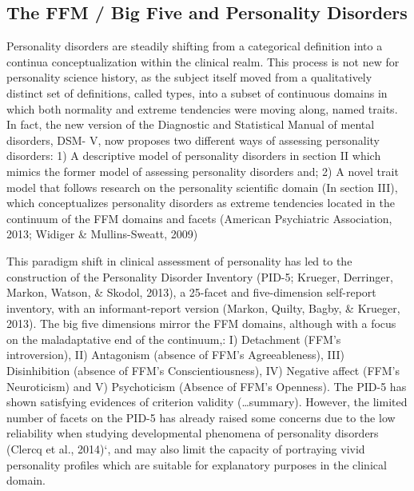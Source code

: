 \documentclass[man]{apa6}
\theoremstyle{definition}
\theoremstyle{definition}
\theoremstyle{definition}
\theoremstyle{remark}
\begin{document}
\hypertarget{the-ffm-big-five-and-personality-disorders}{%
\subsection{The FFM / Big Five and Personality
Disorders}\label{the-ffm-big-five-and-personality-disorders}}

Personality disorders are steadily shifting from a categorical
definition into a continua conceptualization within the clinical realm.
This process is not new for personality science history, as the subject
itself moved from a qualitatively distinct set of definitions, called
types, into a subset of continuous domains in which both normality and
extreme tendencies were moving along, named traits. In fact, the new
version of the Diagnostic and Statistical Manual of mental disorders,
DSM- V, now proposes two different ways of assessing personality
disorders: 1) A descriptive model of personality disorders in section II
which mimics the former model of assessing personality disorders and; 2)
A novel trait model that follows research on the personality scientific
domain (In section III), which conceptualizes personality disorders as
extreme tendencies located in the continuum of the FFM domains and
facets (American Psychiatric Association, 2013; Widiger \&
Mullins-Sweatt, 2009)

This paradigm shift in clinical assessment of personality has led to the
construction of the Personality Disorder Inventory (PID-5; Krueger,
Derringer, Markon, Watson, \& Skodol, 2013), a 25-facet and
five-dimension self-report inventory, with an informant-report version
(Markon, Quilty, Bagby, \& Krueger, 2013). The big five dimensions
mirror the FFM domains, although with a focus on the maladaptative end
of the continuum,: I) Detachment (FFM's introversion), II) Antagonism
(absence of FFM's Agreeableness), III) Disinhibition (absence of FFM's
Conscientiousness), IV) Negative affect (FFM's Neuroticism) and V)
Psychoticism (Absence of FFM's Openness). The PID-5 has shown satisfying
evidences of criterion validity (\ldots{}summary). However, the limited
number of facets on the PID-5 has already raised some concerns due to
the low reliability when studying developmental phenomena of personality
disorders (Clercq et al., 2014)`, and may also limit the capacity of
portraying vivid personality profiles which are suitable for explanatory
purposes in the clinical domain.
\end{document}
